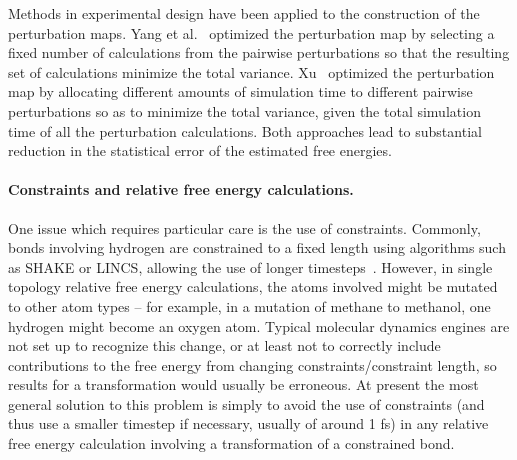 \documentclass[9pt,bestpractices]{livecoms}
\begin{document}
Methods in experimental design have been applied to the construction of the perturbation maps.  Yang et al.~\cite{yang2019optimal} optimized the perturbation map by selecting a fixed number of calculations from the pairwise perturbations so that the resulting set of calculations minimize the total variance.  Xu~\cite{xu2019diffnet} optimized the perturbation map by allocating different amounts of simulation time to different pairwise perturbations so as to minimize the total variance, given the total simulation time of all the perturbation calculations.  Both approaches lead to substantial reduction in the statistical error of the estimated free energies.  
%
\paragraph{Constraints and relative free energy calculations.}
One issue which requires particular care is the use of constraints.
Commonly, bonds involving hydrogen are constrained to a fixed length using algorithms such as SHAKE or LINCS, allowing the use of longer timesteps~\cite{}.
However, in single topology relative free energy calculations, the atoms involved might be mutated to other atom types -- for example, in a mutation of methane to methanol, one hydrogen might become an oxygen atom.
Typical molecular dynamics engines are not set up to recognize this change, or at least not to correctly include contributions to the free energy from changing constraints/constraint length, so results for a transformation would usually be erroneous.
At present the most general solution to this problem is simply to avoid the use of constraints (and thus use a smaller timestep if necessary, usually of around 1 fs) in any relative free energy calculation involving a transformation of a constrained bond.
%
\end{document}
